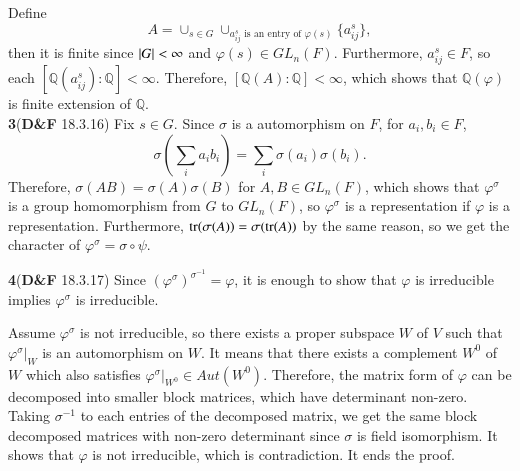 \documentclass[a4paper, 12pt]{article}
\theoremstyle{Mydefinition}
\theoremstyle{Mytheorem}
\begin{document}
Define
\begin{equation}
    A = \cup_{s\in G}\cup_{a^s_{ij}\textrm{ is an entry of }\varphi(s)}\{a^s_{ij}\},
\end{equation}
then it is finite since $\abs{G}<\infty$ and $\varphi(s)\in GL_n(F)$. Furthermore, $a^s_{ij}\in F$, so each $[\mathbb{Q}(a^s_{ij}):\mathbb{Q}]<\infty$. Therefore, $[\mathbb{Q}(A):\mathbb{Q}]<\infty$, which shows that $\mathbb{Q}(\varphi)$ is finite extension of $\mathbb{Q}$.\\

\noindent \textbf{3}(\textbf{D\&F} 18.3.16)
Fix $s\in G$. Since $\sigma$ is a automorphism on $F$, for $a_i,b_i\in F$,
\begin{equation}
    \sigma\left(\sum_i a_ib_i\right) = \sum_i \sigma(a_i)\sigma(b_i).
\end{equation}
Therefore, $\sigma(AB)=\sigma(A)\sigma(B)$ for $A,B\in GL_n(F)$, which shows that $\varphi^\sigma$ is a group homomorphism from $G$ to $GL_n(F)$, so $\varphi^\sigma$ is a representation if $\varphi$ is a representation. Furthermore, $\tr(\sigma(A)) = \sigma(\tr(A))$ by the same reason, so we get the character of $\varphi^\sigma = \sigma\circ \psi$.

\noindent \textbf{4}(\textbf{D\&F} 18.3.17)
Since $(\varphi^\sigma)^{\sigma^{-1}} = \varphi$, it is enough to show that $\varphi$ is irreducible implies $\varphi^\sigma$ is irreducible.

Assume $\varphi^\sigma$ is not irreducible, so there exists a proper subspace $W$ of $V$ such that $\varphi^\sigma|_W$ is an automorphism on $W$. It means that there exists a complement $W^0$ of $W$ which also satisfies $\varphi^\sigma|_{W^0}\in Aut(W^0)$. Therefore, the matrix form of $\varphi$ can be decomposed into smaller block matrices, which have determinant non-zero. Taking $\sigma^{-1}$ to each entries of the decomposed matrix, we get the same block decomposed matrices with non-zero determinant since $\sigma$ is field isomorphism. It shows that $\varphi$ is not irreducible, which is contradiction. It ends the proof.\\
\end{document}
